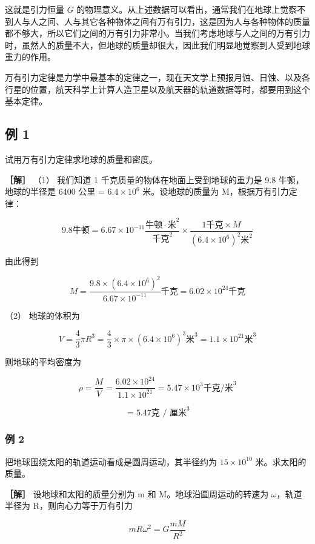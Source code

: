 这就是引力恒量 \(G\)
的物理意义。从上述数据可以看出，通常我们在地球上觉察不到人与人之间、人与其它各种物体之间有万有引力，这是因为人与各种物体的质量都不够大，所以它们之间的万有引力非常小。当我们考虑地球与人之间的万有引力时，虽然人的质量不大，但地球的质量却很大，因此我们明显地觉察到人受到地球重力的作用。

万有引力定律是力学中最基本的定律之一，现在天文学上预报月蚀、日蚀、以及各行星的位置，航天科学上计算人造卫星以及航天器的轨道数据等时，都要用到这个基本定律。

\subsection{例 1}\label{ux4f8b-1-14}

试用万有引力定律求地球的质量和密度。

\textbf{［解］} （1） 我们知道 1 千克质量的物体在地面上受到地球的重力是
9.8 牛顿，地球的半径是 6400 公里 = \(6.4 \times 10^{6}\)
米。设地球的质量为 M，根据万有引力定律：

\[
9.8\text{牛顿} =6.67\times10^{-11}\frac{\text{牛顿}\mathbin{\cdot}\text{米}^{2}}{\text{千克}^{2}} \times\frac{1\text{千克}\times M}{(6.4\times10^{6})^{2}\text{米}^{2}}
\]

由此得到

\[
M = \frac {9.8 \times (6.4 \times 10 ^ {6}) ^ {2}}{6.67 \times 10 ^ {- 11}} \text{千克} = 6.02 \times 10 ^ {24} \text{千克}
\]

（2） 地球的体积为

\[
V = \frac {4}{3} \pi R ^ {3} = \frac {4}{3} \times \pi \times (6.4 \times 10 ^ {6}) ^ {3} \text{米} ^ {3} = 1.1 \times 10 ^ {21} \text{米} ^ {3}
\]

则地球的平均密度为

\[
\rho = \frac {M}{V} = \frac {6.02 \times 10 ^ {24}}{1.1 \times 10 ^ {21}} = 5.47 \times 10 ^ {3} \text{千克/米} ^ {3}
\]

\[
= 5.47 \text{克 / 厘米} ^ {3}
\]

\subsubsection{例 2}\label{ux4f8b-2-14}

把地球围绕太阳的轨道运动看成是圆周运动，其半径约为 \(15 \times 10^{10}\)
米。求太阳的质量。

\textbf{［解］} 设地球和太阳的质量分别为 m 和 M。地球沿圆周运动的转速为
\(\omega\)，轨道半径为 R，则向心力等于万有引力

\[
m R \omega^ {2} = G \frac {m M}{R ^ {2}}
\]


